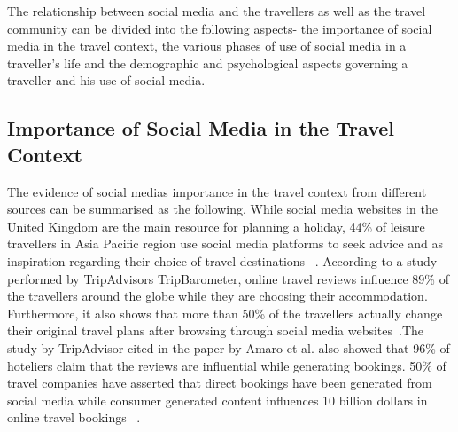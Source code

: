 The relationship between social media and the travellers as well as the travel community can be divided into the following aspects- the importance of social media in the travel context, the various phases of use of social media in a traveller's life and the demographic and psychological aspects governing a traveller and his use of social media.

\subsection{Importance of Social Media in the Travel Context}\label{2.1}

The evidence of social media\textquotesingle s importance in the travel context from different sources can be summarised as the following. While social media websites in the United Kingdom are the main resource for planning a holiday, 44\% of leisure travellers in Asia Pacific region use social media platforms to seek advice and as inspiration regarding their choice of travel destinations ~\cite{amaro2016travelers}. According to a study performed by TripAdvisor\textquotesingle s TripBarometer, online travel reviews influence 89\% of the travellers around the globe while they are choosing their accommodation. Furthermore, it also shows that more than 50\% of the travellers actually change their original travel plans after browsing through social media websites~\cite{amaro2016travelers}.The study by TripAdvisor cited in the paper by Amaro et al. also showed that 96\% of hoteliers claim that the reviews are influential while generating bookings. 50\% of travel companies have asserted that direct bookings have been generated from social media while consumer generated content influences 10 billion dollars in online travel bookings ~\cite{amaro2016travelers}.

